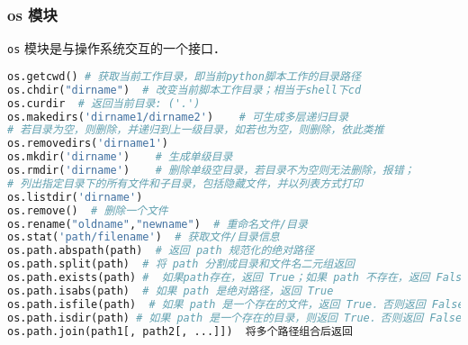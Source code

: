 \subsubsection{os 模块}
\verb|os| 模块是与操作系统交互的一个接口．
\begin{lstlisting}[language=python]
os.getcwd() # 获取当前工作目录，即当前python脚本工作的目录路径
os.chdir("dirname")  # 改变当前脚本工作目录；相当于shell下cd
os.curdir  # 返回当前目录: ('.')
os.makedirs('dirname1/dirname2')    # 可生成多层递归目录
# 若目录为空，则删除，并递归到上一级目录，如若也为空，则删除，依此类推
os.removedirs('dirname1')
os.mkdir('dirname')    # 生成单级目录
os.rmdir('dirname')    # 删除单级空目录，若目录不为空则无法删除，报错；
# 列出指定目录下的所有文件和子目录，包括隐藏文件，并以列表方式打印
os.listdir('dirname')
os.remove()  # 删除一个文件
os.rename("oldname","newname")  # 重命名文件/目录
os.stat('path/filename')  # 获取文件/目录信息
os.path.abspath(path)  # 返回 path 规范化的绝对路径
os.path.split(path)  # 将 path 分割成目录和文件名二元组返回
os.path.exists(path) #  如果path存在，返回 True；如果 path 不存在，返回 False
os.path.isabs(path)  # 如果 path 是绝对路径，返回 True
os.path.isfile(path)  # 如果 path 是一个存在的文件，返回 True．否则返回 False
os.path.isdir(path) # 如果 path 是一个存在的目录，则返回 True．否则返回 False
os.path.join(path1[, path2[, ...]])  将多个路径组合后返回
\end{lstlisting}
